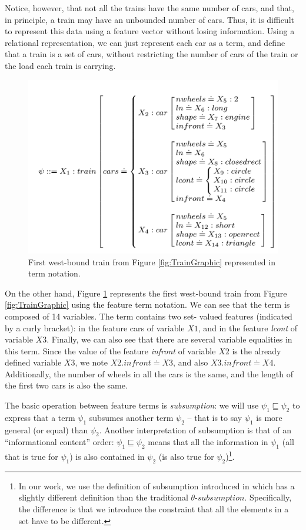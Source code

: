 Notice, however, that not all the trains have the same number of cars, and that, in principle, a train may have an unbounded number of cars. Thus, it is difficult to represent this data using a feature vector without losing information. Using a relational representation, we can just represent each car as a term, and define that a train is a set of cars, without restricting the number of cars of the train or the load each train is carrying.

\begin{figure}\label{fig:TrainFT}
\centering
\includegraphics[scale = 0.4]{figs/trains3}
\caption{First west-bound train from Figure \ref{fig:TrainGraphic} represented in term notation.}
\end{figure}

On the other hand, Figure \ref{fig:TrainFT} represents the first west-bound train from Figure \ref{fig:TrainGraphic} using the feature term notation. We can see that the term is composed of 14 variables. The term contains two set- valued features (indicated by a curly bracket): in the feature cars of variable $X1$, and in the feature \emph{lcont} of variable $X3$. Finally, we can also see that there are several variable equalities in this term. Since the value of the feature \emph{infront} of variable $X2$ is the already defined variable $X3$, we note $X2.infront \doteq X3$, and also $X3.infront \doteq X4$. Additionally, the number of wheels in all the cars is the same, and the length of the first two cars is also the same.

The basic operation between feature terms is \emph{subsumption}: we will use $\psi_{1} \sqsubseteq \psi_{2}$ to express that a term $\psi_{1}$ subsumes another term $\psi_{2}$ – that is to say $\psi_{1}$ is more general (or equal) than $\psi_{2}$. Another interpretation of subsumption is that of an “informational content” order: $\psi_{1} \sqsubseteq \psi_{2}$ means that all the information in $\psi_{1}$ (all that is true for $\psi_{1}$) is also contained in $\psi_{2}$ (is also true for $\psi_{2}$)\footnote{In our work, we use the definition of subsumption introduced in \cite{} which has a slightly different definition than the traditional $\theta$-$subsumption$. Specifically, the difference is that we introduce the constraint that all the elements in a set have to be different.}.

